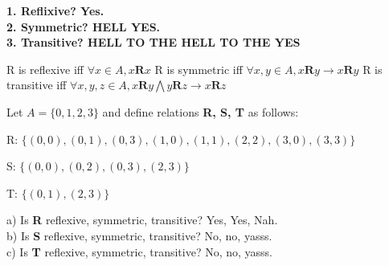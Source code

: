 \documentclass[12pt]{minimal}
\begin{document}
\textbf{
1. Reflixive? Yes. \\
2. Symmetric? HELL YES. \\
3. Transitive? HELL TO THE HELL TO THE YES \\
}

R is reflexive iff $\forall x \in A, x \textbf{R} x$
R is symmetric iff $\forall x, y \in A, x \textbf{R} y \rightarrow x \textbf{R} y$
R is transitive iff $\forall x, y, z \in A, x \textbf{R} y \bigwedge y \textbf{R} z \rightarrow x \textbf{R} z $

Let $A = \{0,1,2,3\}$ and define relations \textbf{R, S, T} as follows:

\noindent R: $\{ (0,0), (0,1), (0,3), (1,0), (1,1), (2,2), (3,0), (3,3) \}$

\noindent S: $\{ (0,0), (0,2), (0,3), (2,3) \}$

\noindent T: $\{ (0,1), (2,3) \}$


\noindent
a) Is \textbf{R} reflexive, symmetric, transitive? Yes, Yes, Nah.\\
b) Is \textbf{S} reflexive, symmetric, transitive? No, no, yasss.\\
c) Is \textbf{T} reflexive, symmetric, transitive? No, no, yasss.\\
\end{document}
